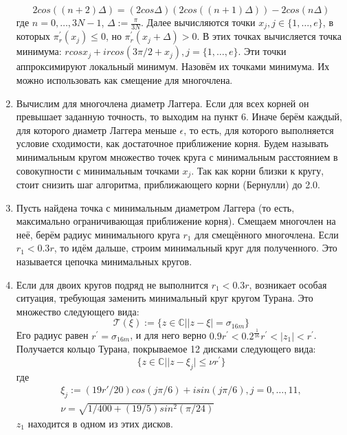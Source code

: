 \documentclass[a4paper,12pt]{article}
\begin{document}
\begin{enumerate}
\[
2cos((n+2)\Delta)=(2cos\Delta)(2cos((n+1)\Delta))-2cos(n\Delta)
\]
где $n=0,\dots,3N-1$, $\Delta:=\frac{\pi}{3N}$.
Далее вычисляются точки $x_j, j \in \{1,\dots,e\}$, в которых $\pi_r^{'}(x_j)\leq0$, но $\pi_r^{'}(x_j+\Delta)>0$. В этих точках вычисляется точка минимума: $rcosx_j+ircos(3\pi/2+x_j), j=\{1,\dots,e\}$. Эти точки аппроксимируют локальный минимум. Назовём их точками минимума. Их можно использовать как смещение для многочлена.
    \item Вычислим для многочлена диаметр Лаггера. Если для всех корней он превышает заданную точность, то выходим на пункт 6. Иначе берём каждый, для которого диаметр Лаггера меньше $\epsilon$, то есть, для которого выполняется условие сходимости, как достаточное приближение корня. Будем называть минимальным кругом множество точек круга с минимальным расстоянием в совокупности с минимальным точками $x_j$. Так как корни близки к кругу, стоит снизить шаг алгоритма, приближающего корни (Бернулли) до 2.0.
    \item Пусть найдена точка с минимальным диаметром Лаггера (то есть, максимально ограничивающая приближение корня). Смещаем многочлен на неё, берём радиус минимального круга $r_1$ для смещённого многочлена. Если $r_1 < 0.3r$, то идём дальше, строим минимальный круг для полученного. Это называется цепочка минимальных кругов.
    \item Если для двоих кругов подряд не выполнится $r_1 < 0.3r$, возникает особая ситуация, требующая заменить минимальный круг кругом Турана. Это множество следующего вида:
\[
\mathcal{T}(\xi):=\{z\in\mathbb{C}||z-\xi|=\sigma_{16m}\}
\]
Его радиус равен $r^{'}=\sigma_{16m}$, и для него верно $0.9r^{'}<0.2^\frac{1}{16}r^{'}<|z_1|<r^{'}$. \\
Получается кольцо Турана, покрываемое 12 дисками следующего вида: 
\begin{equation}
    \{z \in \mathbb{C}||z-\xi_j|\leq \nu r^{'}\}
\end{equation}
где
\begin{align}
    \xi_j:=(19r{'}/20)cos(j\pi/6)+isin(j\pi/6), j=0,\dots,11,  \\
    \nu=\sqrt{1/400+(19/5)sin^{2}(\pi/24)}
    \end{align}
$z_1$ находится в одном из этих дисков. \\
\end{enumerate}
\newpage
\end{document}
